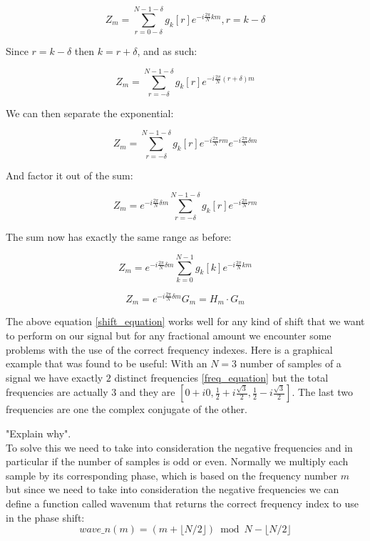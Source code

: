 \documentclass[]{usiinfbachelorproject}
\begin{document}
	\begin{equation*}
		Z_m = \displaystyle\sum_{r = 0 - \delta}^{N-1-\delta}g_k[r]e^{-i \frac{2\pi}{N} km}, r = k - \delta 
	\end{equation*}
	
	Since $r = k - \delta$ then $ k = r + \delta$, and as such:
	
	\begin{equation*}
		Z_m = \displaystyle\sum_{r= -\delta}^{N-1 - \delta}g_k[r]e^{-i \frac{2\pi}{N} (r + \delta)m}
	\end{equation*}
	
	We can then separate the exponential:
	
	\begin{equation*}
		Z_m = \displaystyle\sum_{r= -\delta}^{N-1 - \delta}g_k[r]e^{-i \frac{2\pi}{N} rm}e^{-i \frac{2\pi}{N}  \delta m}
	\end{equation*}
	
	And factor it out of the sum:
	
	\begin{equation*}
		Z_m = e^{-i \frac{2\pi}{N}  \delta m} \displaystyle\sum_{r= -\delta}^{N-1 - \delta}g_k[r]e^{-i \frac{2\pi}{N} rm}
	\end{equation*}
	
	The sum now has exactly the same range as before:
	
	\begin{equation*}
		Z_m = e^{-i \frac{2\pi}{N}  \delta m} \displaystyle\sum_{k=0}^{N-1}g_k[k]e^{-i \frac{2\pi}{N} km}
	\end{equation*}
	
	\begin{equation}
		Z_m = e^{-i \frac{2\pi}{N}  \delta m} G_m = H_m \cdot G_m \label{shift_equation}
	\end{equation}
	
	
	The above equation \ref{shift_equation} works well for any kind of shift that we want to perform on our signal but for any fractional amount we encounter some problems with the use of the correct frequency indexes.
	Here is a graphical example that was found to be useful: With an $N=3$ number of samples of a signal we have exactly $2$ distinct frequencies \ref{freq_equation} but the total frequencies are actually $3$ and they are $[0+i0, \frac{1}{2}+i\frac{\sqrt{3}}{2}, \frac{1}{2}-i\frac{\sqrt{3}}{2}]$. The last two frequencies are one the complex conjugate of the other.
	
	"Explain why".\\
	To solve this we need to take into consideration the negative frequencies and in particular if the number of samples is odd or even.
	Normally we multiply each sample by its corresponding phase, which is based on the frequency number $m$
	but since we need to take into consideration the negative frequencies we can define a function called wavenum that returns the correct frequency index to use in the phase shift:
	\begin{equation*}
		wave\_n(m) = (m + \lfloor N/2 \rfloor ) \bmod N - \lfloor N/2 \rfloor
	\end{equation*}
	
\end{document}
